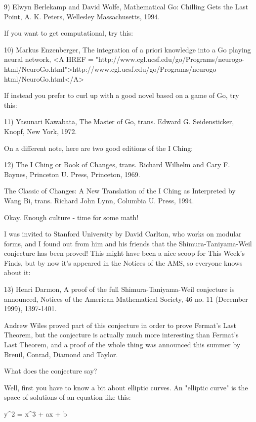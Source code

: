 9) Elwyn Berlekamp and David Wolfe, Mathematical Go: Chilling
Gets the Last Point, A. K. Peters, Wellesley Massachusetts, 1994.

If you want to get computational, try this:

10) Markus Enzenberger, The integration of a priori knowledge into
a Go playing neural network, 
<A HREF = "http://www.cgl.ucsf.edu/go/Programs/neurogo-html/NeuroGo.html">http://www.cgl.ucsf.edu/go/Programs/neurogo-html/NeuroGo.html</A>

If instead you prefer to curl up with a good novel based
on a game of Go, try this:

11) Yasunari Kawabata, The Master of Go, trans. Edward G. 
Seidensticker, Knopf, New York, 1972.  

On a different note, here are two good editions of the I Ching:

12) The I Ching or Book of Changes, trans. Richard Wilhelm and Cary F.
Baynes, Princeton U. Press, Princeton, 1969.

The Classic of Changes: A New Translation of the I Ching as Interpreted
by Wang Bi, trans. Richard John Lynn, Columbia U. Press, 1994.

Okay.  Enough culture - time for some math!

I was invited to Stanford University by David Carlton, who works on
modular forms, and I found out from him and his friends that the
Shimura-Taniyama-Weil conjecture has been proved!  This might have been
a nice scoop for This Week's Finds, but by now it's appeared in the
Notices of the AMS, so everyone knows about it:

13) Henri Darmon, A proof of the full Shimura-Taniyama-Weil conjecture
is announced, Notices of the American Mathematical Society, 46 no. 11
(December 1999), 1397-1401.

Andrew Wiles proved part of this conjecture in order to prove Fermat's
Last Theorem, but the conjecture is actually much more interesting than
Fermat's Last Theorem, and a proof of the whole thing was announced this
summer by Breuil, Conrad, Diamond and Taylor.  

What does the conjecture say?  

Well, first you have to know a bit about elliptic curves.  An 
"elliptic curve" is the space of solutions of an equation like 
this:

y^{2} = x^{3} + ax + b

